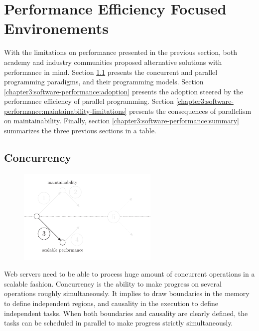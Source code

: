 \section{Performance Efficiency Focused Environements} \label{chapter3:software-performance}

With the limitations on performance presented in the previous section, both academy and industry communities proposed alternative solutions with performance in mind.
Section \ref{chapter3:software-performance:concurrency} presents the concurrent and parallel programming paradigms, and their programming models. %
Section \ref{chapter3:software-performance:adoption} presents the adoption steered by the performance efficiency of parallel programming.
Section \ref{chapter3:software-performance:maintainability-limitations} presents the consequences of parallelism on maintainability.
Finally, section \ref{chapter3:software-performance:summary} summarizes the three previous sections in a table.

\subsection{Concurrency} \label{chapter3:software-performance:concurrency}

\begin{figure}[h!]
\begin{center}
\includegraphics[width=0.6\textwidth]{../ressources/state-of-the-art-3.pdf}
\end{center}
\caption{}
\label{fig:state-of-the-art-3}
\end{figure}

Web servers need to be able to process huge amount of concurrent operations in a scalable fashion.
Concurrency is the ability to make progress on several operations roughly simultaneously.
It implies to draw boundaries in the memory to define independent regions, and causality in the execution to define independent tasks.
When both boundaries and causality are clearly defined, the tasks can be scheduled in parallel to make progress strictly simultaneously.

